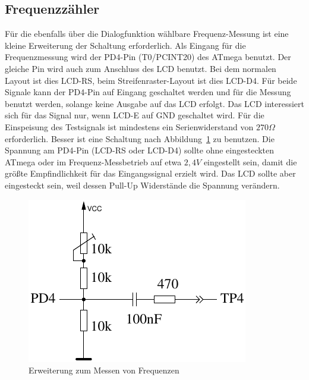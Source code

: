 \subsection{Frequenzzähler}
\label{sec:frequency_counter}
Für die ebenfalls über die Dialogfunktion wählbare Frequenz-Messung ist eine kleine Erweiterung
der Schaltung erforderlich. Als Eingang für die Frequenzmessung wird der PD4-Pin (T0/PCINT20) des
ATmega benutzt. Der gleiche Pin wird auch zum Anschluss des LCD benutzt. Bei dem normalen Layout
ist dies LCD-RS, beim Streifenraster-Layout ist dies LCD-D4. Für beide Signale kann der PD4-Pin
auf Eingang geschaltet werden und für die Messung benutzt werden, solange keine Ausgabe auf das
LCD erfolgt. Das LCD interessiert sich für das Signal nur, wenn LCD-E auf GND geschaltet wird.
Für die Einspeisung des Testsignals ist mindestens ein Serienwiderstand von \(270\Omega\) erforderlich.
Besser ist eine Schaltung nach Abbildung~\ref{fig:FreqMes} zu benutzen. Die Spannung am PD4-Pin (LCD-RS oder
LCD-D4) sollte ohne eingesteckten ATmega oder im Frequenz-Messbetrieb auf etwa \(2,4V\) eingestellt sein,
damit die größte Empfindlichkeit für das Eingangssignal erzielt wird. Das LCD sollte aber eingesteckt sein,
weil dessen Pull-Up Widerstände die Spannung verändern.

\begin{figure}[H]
\centering
\includegraphics[width=.4\textwidth]{../FIG/Frequency_addon.pdf}	%
\caption{Erweiterung zum Messen von Frequenzen}
\label{fig:FreqMes}
\end{figure}

